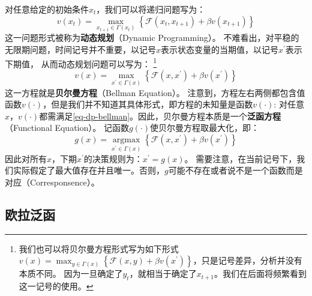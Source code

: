 对任意给定的初始条件$x_t$，我们可以将递归问题写为：
\begin{equation*}
    v\left(x_t\right) = 
        \max _{x_{t+1} \in \Gamma\left(x_t\right)}
        \left\{\mathcal{F}\left(x_t, x_{t+1}\right)+\beta v\left(x_{t+1}\right)\right\}
\end{equation*}
这一问题形式被称为\textbf{动态规划}（Dynamic Programming）。
不难看出，对平稳的无限期问题，时间记号并不重要，以记号$x$表示状态变量的当期值，以记号$x^{\prime}$表示下期值，
从而动态规划问题可以写为：
\footnote{我们也可以将贝尔曼方程形式写为如下形式$v(x)=\max _{y \in \Gamma(x)}\left\{\mathcal{F}\left(x, y\right)
+\beta v\left(x^{\prime}\right)\right\}$，只是记号差异，分析并没有本质不同。
因为一旦确定了$y_t$，就相当于确定了$x_{t+1}$。我们在后面将频繁看到这一记号的使用。}
\begin{equation}    \label{eq-dp-bellman}
    v(x) = \max _{x^{\prime} \in \Gamma(x)}
        \left\{\mathcal{F}\left(x, x^{\prime}\right)+\beta v\left(x^{\prime}\right)\right\}
\end{equation}
这一方程就是\textbf{贝尔曼方程}（Bellman Equation）。
注意到，方程左右两侧都包含值函数$v(\cdot)$，但是我们并不知道其具体形式，即方程的未知量是函数$v(\cdot)$:
对任意$x$，$v(\cdot)$都需满足\cref{eq-dp-bellman}。因此，贝尔曼方程本质是一个\textbf{泛函方程}（Functional Equation）。
记函数$g(\cdot)$使贝尔曼方程取最大化，即：
\begin{equation*}
    g(x) = \underset{x^{\prime} \in \Gamma(x)}{\operatorname{argmax}}
        \left\{\mathcal{F}\left(x, x^{\prime}\right)+\beta v\left(x^{\prime}\right)\right\}
\end{equation*}
因此对所有$x$，下期$x^{\prime}$的决策规则为：$x^{\prime}=g(x)$。
需要注意，在当前记号下，我们实际假定了最大值存在并且唯一。否则，$g$可能不存在或者说不是一个函数而是对应（Corresponsence）。


\subsection{欧拉泛函}

